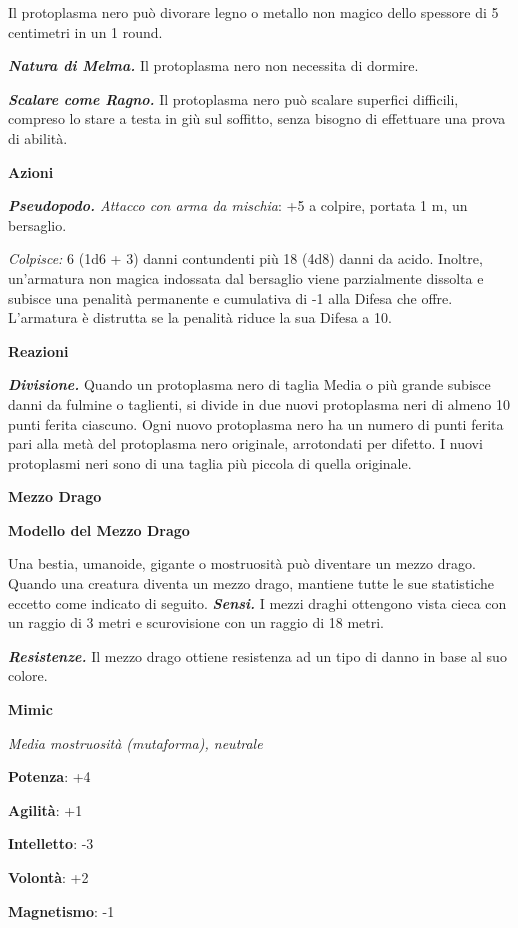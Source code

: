 \begin{multicols}{2}
Il protoplasma nero può divorare legno o metallo non magico dello
spessore di 5 centimetri in un 1 round.

\emph{\textbf{Natura di Melma.}} Il protoplasma nero non necessita di
dormire.

\emph{\textbf{Scalare come Ragno.}} Il protoplasma nero può scalare
superfici difficili, compreso lo stare a testa in giù sul soffitto,
senza bisogno di effettuare una prova di abilità.

\smallskip\textbf{Azioni}

\emph{\textbf{Pseudopodo.} Attacco con arma da mischia}: +5 a colpire,
portata 1 m, un bersaglio.

\emph{Colpisce:} 6 (1d6 + 3) danni contundenti più 18 (4d8) danni da
acido. Inoltre, un'armatura non magica indossata dal bersaglio viene
parzialmente dissolta e subisce una penalità permanente e cumulativa di
-1 alla Difesa che offre. L'armatura è distrutta se la penalità riduce la
sua Difesa a 10.

\textbf{Reazioni}

\emph{\textbf{Divisione.}} Quando un protoplasma nero di taglia Media o
più grande subisce danni da fulmine o taglienti, si divide in due nuovi
protoplasma neri di almeno 10 punti ferita ciascuno. Ogni nuovo
protoplasma nero ha un numero di punti ferita pari alla metà del
protoplasma nero originale, arrotondati per difetto. I nuovi protoplasmi
neri sono di una taglia più piccola di quella originale.

\textbf{Mezzo Drago}

\textbf{Modello del Mezzo Drago}

Una bestia, umanoide, gigante o mostruosità può diventare un mezzo
drago. Quando una creatura diventa un mezzo drago, mantiene tutte le sue
statistiche eccetto come indicato di seguito. \emph{\textbf{Sensi.}} I
mezzi draghi ottengono vista cieca con un raggio di 3 metri e
scurovisione con un raggio di 18 metri.

\emph{\textbf{Resistenze.}} Il mezzo drago ottiene resistenza ad un tipo
di danno in base al suo colore.

\textbf{Mimic}

\emph{Media mostruosità (mutaforma), neutrale}

\textbf{Potenza}: +4

\textbf{Agilità}: +1

\textbf{Intelletto}: -3

\textbf{Volontà}: +2

\textbf{Magnetismo}: -1


\end{multicols}
